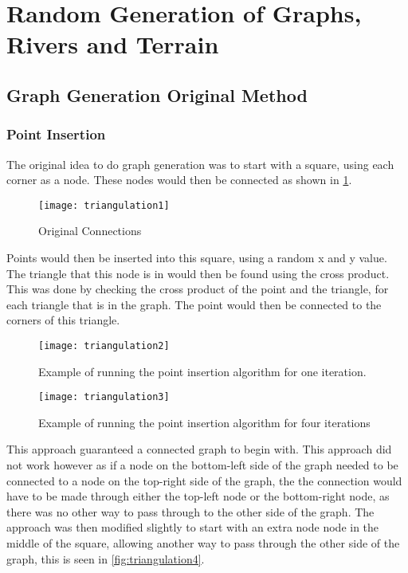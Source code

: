 \section{Random Generation of Graphs, Rivers and Terrain}

\subsection{Graph Generation Original Method}\label{subsec:GGOM}
\subsubsection{Point Insertion}
	The original idea to do graph generation was to start with a square, using each corner as a node. These nodes would then be connected as shown in \ref{fig:triangulation1}.\\

\begin{figure}[H]
	\texttt{[image: triangulation1]}
	\centering
	\caption{Original Connections}
	\label{fig:triangulation1}
\end{figure}

	Points would then be inserted into this square, using a random x and y value.  The triangle that this node is in would then be found using the cross product. This was done by checking the cross product of the point and the triangle, for each triangle that is in the graph. The point would then be connected to the corners of this triangle.\\

\begin{figure}[H]
	\texttt{[image: triangulation2]}
	\centering
	\caption{Example of running the point insertion algorithm for one iteration.}
	\label{fig:triangulation2}
\end{figure}

\begin{figure}[H]
	\texttt{[image: triangulation3]}
	\centering
	\caption{Example of running the point insertion algorithm for four iterations}
	\label{fig:triangulation3}
\end{figure}

	This approach guaranteed a connected graph to begin with. This approach did not work however as if a node on the bottom-left side of the graph needed to be connected to a node on the top-right side of the graph, the the connection would have to be made through either the top-left node or the bottom-right node, as there was no other way to pass through to the other side of the graph. The approach was then modified slightly to start with an extra node node in the middle of the square, allowing another way to pass through the other side of the graph, this is seen in \ref{fig:triangulation4}.

